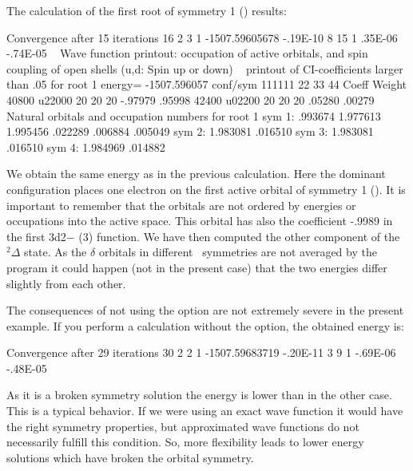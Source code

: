 The calculation of the first root of symmetry 1 (\ao) results:

\begin{sourcelisting}
      Convergence after  15 iterations
       16   2    3    1 -1507.59605678    -.19E-10   8  15 1   .35E-06  -.74E-05  
~
                                  Wave function printout:
occupation of active orbitals, and spin coupling of open shells (u,d: Spin up or down)
~
      printout of CI-coefficients larger than   .05 for root   1
      energy=  -1507.596057
      conf/sym  111111 22 33 44     Coeff  Weight
         40800  u22000 20 20 20   -.97979  .95998
         42400  u02200 20 20 20    .05280  .00279
~
      Natural orbitals and occupation numbers for root  1
      sym 1:    .993674   1.977613   1.995456    .022289    .006884    .005049
      sym 2:   1.983081    .016510
      sym 3:   1.983081    .016510
      sym 4:   1.984969    .014882
\end{sourcelisting}

We obtain the same energy as in the previous calculation. Here the dominant 
configuration places one electron on the first active orbital of symmetry 1 (\ao).
It is important to remember that the orbitals are not ordered by energies or
occupations into the active space. This orbital has also the coefficient -.9989
in the first 3d2$-$ (3\dxtyt) function. We have then computed the other 
component of the $^2\Delta$ state. As the $\delta$ orbitals in different \Ctv\
symmetries are not averaged
by the program it could happen (not in the present case) that the two energies
differ slightly from each other.

The consequences of not using the  option are not extremely
severe in the present example. If you perform a calculation without the
option, the obtained energy is:

\begin{sourcelisting}
      Convergence after  29 iterations
       30   2    2    1 -1507.59683719    -.20E-11   3   9 1  -.69E-06  -.48E-05  
\end{sourcelisting}

As it is a broken symmetry solution the energy is lower than in the other
case. This is a typical behavior. If we were using an exact wave function 
it would have the right symmetry properties, but approximated wave
functions do not necessarily fulfill this condition. So, more flexibility leads to
lower energy solutions which have broken the orbital symmetry. 

